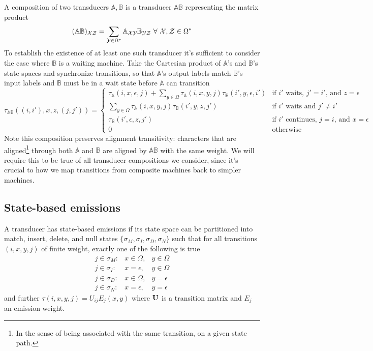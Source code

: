 \documentclass{article}
\begin{document}
A composition of two transducers $\mathbb{A},\mathbb{B}$ is a transducer $\mathbb{AB}$ representing the matrix product
\[
(\mathbb{AB})_{{\cal XZ}} = \sum_{{\cal Y} \in \Omega^\ast} \mathbb{A}_{\cal XY} \mathbb{B}_{\cal YZ} \ \forall\ {\cal X},{\cal Z} \in \Omega^\ast
\]
To establish the existence of at least one such transducer it's sufficient to consider the case where $\mathbb{B}$ is a waiting machine.
Take the Cartesian product of $\mathbb{A}$'s and $\mathbb{B}$'s state spaces and synchronize transitions,
so that $\mathbb{A}$'s output labels match $\mathbb{B}$'s input labels and $\mathbb{B}$ must be in a wait state before $\mathbb{A}$ can transition
\[
  \tau_{\mathbb{AB}}((i,i'),x,z,(j,j')) = \left\{
  \begin{array}{ll}
    \tau_{\mathbb{A}}(i,x,\epsilon,j) + \displaystyle \sum_{y \in \Omega} \tau_{\mathbb{A}}(i,x,y,j) \tau_{\mathbb{B}}(i',y,\epsilon,i') & \mbox{if $i'$ waits, $j' = i'$, and $z = \epsilon$} \\
    \displaystyle \sum_{y \in \Omega} \tau_{\mathbb{A}}(i,x,y,j) \tau_{\mathbb{B}}(i',y,z,j') & \mbox{if $i'$ waits and $j' \neq i'$} \\
    \tau_{\mathbb{B}}(i',\epsilon,z,j') & \mbox{if $i'$ continues, $j = i$, and $x = \epsilon$} \\
    0 & \mbox{otherwise}
  \end{array} \right.
\]
Note this composition preserves alignment transitivity: characters that are aligned\footnote{In the sense of being associated with the same transition, on a given state path.}
through both $\mathbb{A}$ and $\mathbb{B}$ are aligned by $\mathbb{AB}$ with the same weight.
We will require this to be true of all transducer compositions we consider,
since it's crucial to how we map transitions from composite machines back to simpler machines.

\subsection{State-based emissions}

A transducer has state-based emissions if its state space can be partitioned into
match, insert, delete, and null states $\{ \sigma_M, \sigma_I, \sigma_D, \sigma_N \}$
such that for all transitions $(i,x,y,j)$ of finite weight, exactly one of the following is true
\begin{eqnarray*}
  j \in \sigma_M: & x \in \Omega, & y \in \Omega \\
  j \in \sigma_I: & x = \epsilon, & y \in \Omega \\
  j \in \sigma_D: & x \in \Omega, & y = \epsilon \\
  j \in \sigma_N: & x = \epsilon, & y = \epsilon
\end{eqnarray*}
and further $\tau(i,x,y,j) = U_{ij} E_j(x,y)$ where ${\bf U}$ is a transition matrix and $E_j$ an emission weight.
\end{document}
